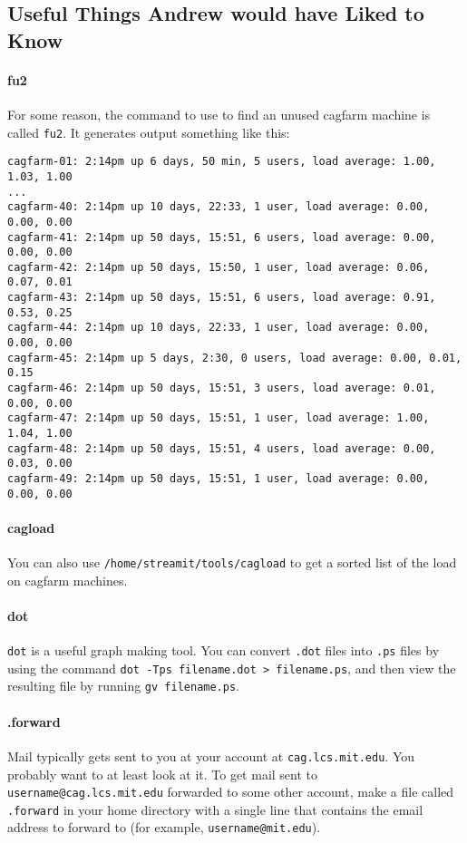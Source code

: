 \subsection{Useful Things Andrew would have Liked to Know}

\paragraph{fu2}
For some reason, the command to use to find an unused cagfarm machine
is called {\tt fu2}. It generates output something like this:
\begin{verbatim}
cagfarm-01: 2:14pm up 6 days, 50 min, 5 users, load average: 1.00, 1.03, 1.00
...
cagfarm-40: 2:14pm up 10 days, 22:33, 1 user, load average: 0.00, 0.00, 0.00
cagfarm-41: 2:14pm up 50 days, 15:51, 6 users, load average: 0.00, 0.00, 0.00
cagfarm-42: 2:14pm up 50 days, 15:50, 1 user, load average: 0.06, 0.07, 0.01
cagfarm-43: 2:14pm up 50 days, 15:51, 6 users, load average: 0.91, 0.53, 0.25
cagfarm-44: 2:14pm up 10 days, 22:33, 1 user, load average: 0.00, 0.00, 0.00
cagfarm-45: 2:14pm up 5 days, 2:30, 0 users, load average: 0.00, 0.01, 0.15
cagfarm-46: 2:14pm up 50 days, 15:51, 3 users, load average: 0.01, 0.00, 0.00
cagfarm-47: 2:14pm up 50 days, 15:51, 1 user, load average: 1.00, 1.04, 1.00
cagfarm-48: 2:14pm up 50 days, 15:51, 4 users, load average: 0.00, 0.03, 0.00
cagfarm-49: 2:14pm up 50 days, 15:51, 1 user, load average: 0.00, 0.00, 0.00
\end{verbatim}

\paragraph{cagload}

You can also use {\tt /home/streamit/tools/cagload} to get a sorted
list of the load on cagfarm machines.

\paragraph{dot}
\label{sec:dot}
{\tt dot} is a useful graph making tool. You can convert {\tt .dot}
files into {\tt .ps} files by using the command {\tt dot -Tps
  filename.dot > filename.ps}, and then view the resulting file by
running {\tt gv filename.ps}.

\paragraph{.forward}
Mail typically gets sent to you at your account at {\tt cag.lcs.mit.edu}. 
You probably want to
at least look at it. To get mail sent to {\tt username@cag.lcs.mit.edu}
forwarded to some other account, make a file called {\tt .forward}
in your home directory with a single line that contains the email address
to forward to (for example, {\tt username@mit.edu}).

